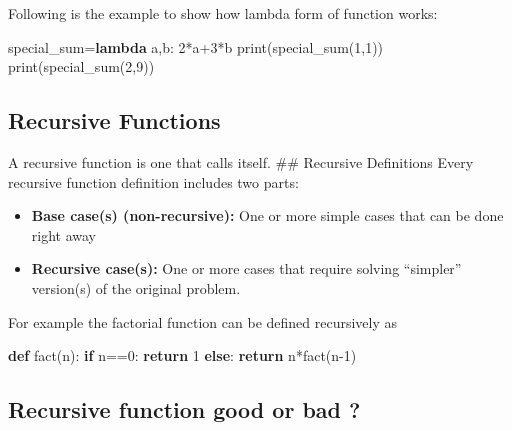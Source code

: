\documentclass[11pt]{article}
\providecommand{\tightlist}{%
      \setlength{\itemsep}{0pt}\setlength{\parskip}{0pt}}
\newenvironment{Shaded}{}{}
\newcommand{\KeywordTok}[1]{\textcolor[rgb]{0.00,0.44,0.13}{\textbf{{#1}}}}
\newcommand{\DecValTok}[1]{\textcolor[rgb]{0.25,0.63,0.44}{{#1}}}
\newcommand{\NormalTok}[1]{{#1}}
\newcommand{\ControlFlowTok}[1]{\textcolor[rgb]{0.00,0.44,0.13}{\textbf{{#1}}}}
\newcommand{\OperatorTok}[1]{\textcolor[rgb]{0.40,0.40,0.40}{{#1}}}
\newcommand{\BuiltInTok}[1]{{#1}}
\begin{document}
Following is the example to show how lambda form of function works:

\begin{Shaded}
\begin{Highlighting}[]
\NormalTok{special\_sum}\OperatorTok{=}\KeywordTok{lambda}\NormalTok{ a,b: }\DecValTok{2}\OperatorTok{*}\NormalTok{a}\OperatorTok{+}\DecValTok{3}\OperatorTok{*}\NormalTok{b}
    \BuiltInTok{print}\NormalTok{(special\_sum(}\DecValTok{1}\NormalTok{,}\DecValTok{1}\NormalTok{))}
    \BuiltInTok{print}\NormalTok{(special\_sum(}\DecValTok{2}\NormalTok{,}\DecValTok{9}\NormalTok{))}
\end{Highlighting}
\end{Shaded}

\hypertarget{recursive-functions}{%
\subsection{Recursive Functions}\label{recursive-functions}}

A recursive function is one that calls itself. \#\# Recursive
Definitions Every recursive function definition includes two parts:

\begin{itemize}
\tightlist
\item
  \textbf{Base case(s) (non-recursive):} One or more simple cases that
  can be done right away
\item
  \textbf{Recursive case(s):} One or more cases that require solving
  ``simpler'' version(s) of the original problem.
\end{itemize}

For example the factorial function can be defined recursively as

\begin{Shaded}
\begin{Highlighting}[]
\KeywordTok{def}\NormalTok{ fact(n):}
    \ControlFlowTok{if}\NormalTok{ n}\OperatorTok{==}\DecValTok{0}\NormalTok{:}
        \ControlFlowTok{return} \DecValTok{1}
    \ControlFlowTok{else}\NormalTok{:}
        \ControlFlowTok{return}\NormalTok{ n}\OperatorTok{*}\NormalTok{fact(n}\OperatorTok{{-}}\DecValTok{1}\NormalTok{)}
\end{Highlighting}
\end{Shaded}

\hypertarget{recursive-function-good-or-bad}{%
\subsection{Recursive function good or bad
?}\label{recursive-function-good-or-bad}}
\end{document}
